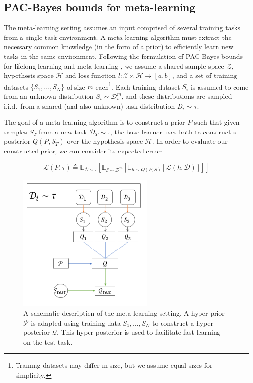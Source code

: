 \documentclass{article}
\theoremstyle{definition}
\newcommand{\Expect}[2]{\mathbb{E}_{#1}\left [#2 \right ]}
\begin{document}
\subsection{PAC-Bayes bounds for meta-learning} \label{sec:meta}

The meta-learning setting assumes an input comprised of several training tasks from a single task environment. A meta-learning algorithm must extract the necessary common knowledge (in the form of a prior) to efficiently learn new tasks in the same environment. Following the formulation of PAC-Bayes bounds for lifelong learning \citep{Pentina2014} and meta-learning \citep{Amit2018}, we assume a shared sample space $\mathcal{Z}$, hypothesis space $\mathcal{H}$ and loss function $l:\mathcal{Z}\times \mathcal{H}\rightarrow [a,b]$, and a set of training datasets $\{S_1,...,S_N\}$ of size $m$ each\footnote{Training datasets may differ in size, but we assume equal sizes for simplicity.}. Each training dataset $S_i$ is assumed to come from an unknown distribution $S_i\sim \mathcal{D}^m_i$, and these distributions are sampled i.i.d.\ from a shared (and also unknown) task distribution $D_i\sim \tau$.

The goal of a meta-learning algorithm is to construct a prior $P$ such that given samples $S_T$ from a new task $\mathcal{D}_T\sim \tau$, the base learner uses both to construct a posterior $Q(P, S_T)$ over the hypothesis space $\mathcal{H}$. In order to evaluate our constructed prior, we can consider its expected error:

\begin{equation}
\mathcal{L}(P, \tau)\triangleq \Expect{\mathcal{D}\sim \tau}{\Expect{S\sim \mathcal{D}^m}{\Expect{h\sim Q(P, S)}{\mathcal{L}(h, \mathcal{D})}}}
\end{equation}

\begin{figure}[t]
	\centering
	\includegraphics[width=0.6\textwidth]{setup_ml.PNG}
	\caption{A schematic description of the meta-learning setting. A hyper-prior $\mathcal{P}$ is adapted using training data $S_1,\ldots,S_N$ to construct a hyper-posterior $\mathcal{Q}$. This hyper-posterior is used to facilitate fast learning on the test task.}
	\label{fig:meta-learning-setting}
\end{figure}
\end{document}
